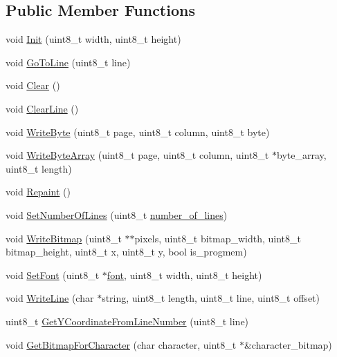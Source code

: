 \subsection*{Public Member Functions}
\begin{DoxyCompactItemize}
\item 
void \hyperlink{class_o_l_e_d_a2c8205c8eac9d7a2b181657561e9b4d2}{Init} (uint8\-\_\-t width, uint8\-\_\-t height)
\item 
void \hyperlink{class_o_l_e_d_a8d314130676b104ed959b92ab4bac25e}{Go\-To\-Line} (uint8\-\_\-t line)
\item 
void \hyperlink{class_o_l_e_d_a6c7bb1fc91b3e574a275f90643da140a}{Clear} ()
\item 
void \hyperlink{class_o_l_e_d_a3a571f5ea7a183fa14932cd5b2c423eb}{Clear\-Line} ()
\item 
void \hyperlink{class_o_l_e_d_a7fa307269dbd2e80a6e48a1442df83d2}{Write\-Byte} (uint8\-\_\-t page, uint8\-\_\-t column, uint8\-\_\-t byte)
\item 
void \hyperlink{class_o_l_e_d_a7fffc17a5439300d361414c15a7a2dbe}{Write\-Byte\-Array} (uint8\-\_\-t page, uint8\-\_\-t column, uint8\-\_\-t $\ast$byte\-\_\-array, uint8\-\_\-t length)
\item 
void \hyperlink{class_o_l_e_d_a3efa34861b4ae0bc5323f6b7cf1d8a01}{Repaint} ()
\item 
void \hyperlink{class_o_l_e_d_aa3c88e19f05340036ea5ac9e2d1ea5dc}{Set\-Number\-Of\-Lines} (uint8\-\_\-t \hyperlink{class_o_l_e_d_a9ea1c55112deede1a61142af276a6bc9}{number\-\_\-of\-\_\-lines})
\item 
void \hyperlink{class_o_l_e_d_a3cb468f16387343f6db387a86cded8af}{Write\-Bitmap} (uint8\-\_\-t $\ast$$\ast$pixels, uint8\-\_\-t bitmap\-\_\-width, uint8\-\_\-t bitmap\-\_\-height, uint8\-\_\-t x, uint8\-\_\-t y, bool is\-\_\-progmem)
\item 
void \hyperlink{class_o_l_e_d_abe6073c961cadc4c9b693eb8dc8198bd}{Set\-Font} (uint8\-\_\-t $\ast$\hyperlink{class_o_l_e_d_a29ab86a4a73f4d343bf1810927f0911d}{font}, uint8\-\_\-t width, uint8\-\_\-t height)
\item 
void \hyperlink{class_o_l_e_d_a0ffccb4fd874b997c869c5d511f76df8}{Write\-Line} (char $\ast$string, uint8\-\_\-t length, uint8\-\_\-t line, uint8\-\_\-t offset)
\item 
uint8\-\_\-t \hyperlink{class_o_l_e_d_a5b6d41d5d699998f54ea6e3b6562ac5b}{Get\-Y\-Coordinate\-From\-Line\-Number} (uint8\-\_\-t line)
\item 
void \hyperlink{class_o_l_e_d_a3bd2f2f05568441e1e0533eaf0db58f8}{Get\-Bitmap\-For\-Character} (char character, uint8\-\_\-t $\ast$\&character\-\_\-bitmap)
\end{DoxyCompactItemize}
